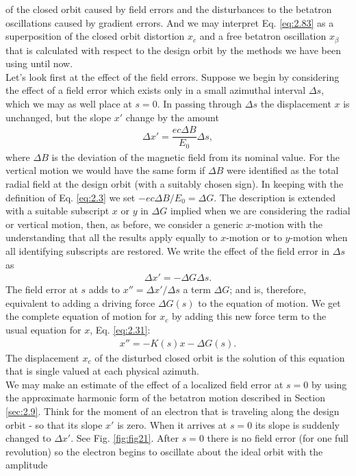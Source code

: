  of the closed orbit caused by field errors and the disturbances to the betatron oscillations
 caused by gradient errors. And we may interpret Eq. \eqref{eq:2.83} as a superposition of the closed orbit distortion $x_c$ and a free betatron oscillation $x_\beta$ that is calculated with respect to the design orbit by the methods we have been using until now.\\
Let's look first at the effect of the field errors. Suppose we begin by considering the effect of a field error which exists only in a small azimuthal interval $\Delta s$, which we may as well place at $s = 0$. In passing through $\Delta s$ the displacement $x$ is unchanged, but the slope $x'$ change by the amount
\begin{align*}
	\Delta x' = \dfrac{ec\Delta B}{E_0}\Delta s,
\end{align*}
where $\Delta B$ is the deviation of the magnetic field from its nominal value. For the vertical motion we would have the same form if $\Delta B$ were identified as the total radial field at the design orbit (with a suitably chosen sign). In keeping with the definition of Eq. \eqref{eq:2.3} we set $-ec \Delta B/E_0 = \Delta G$. The description is extended with a suitable subscript $x$ or $y$ in $\Delta G$ implied when we are considering the radial or vertical motion, then, as before, we consider a generic $x$-motion with the understanding that all the results apply equally to $x$-motion or to $y$-motion when all identifying subscripts are restored. We write the effect of the field error in $\Delta s$ as
\begin{align}\label{eq:2.84}
	\Delta x' = -\Delta G \Delta s.
\end{align}
The field error at $s$ adds to $x'' = \Delta x'/\Delta s$ a term $\Delta G$; and is, therefore, equivalent to adding a driving force $\Delta G(s)$ to the equation of motion. We get the complete
equation of motion for $x_c$ by adding this new force term to the usual equation for $x$, Eq. \eqref{eq:2.31}:
\begin{align}\label{eq:2.85}
	x'' = -K(s)x -\Delta G(s).
\end{align}
The displacement $x_c$ of the disturbed closed orbit is the solution of this equation
that is single valued at each physical azimuth.\\
We may make an estimate of the effect of a localized field error at $s = 0$ by using the approximate harmonic form of the betatron motion described in Section \ref{sec:2.9}. Think for the moment of an electron that is traveling along the design orbit - so that its slope $x'$ is zero. When it arrives at $s = 0$ its slope is suddenly changed to $\Delta x'$. See Fig. \ref{fig:fig21}. After $s = 0$ there is no field error (for one full revolution) so the electron begins to oscillate about the ideal orbit with the amplitude
